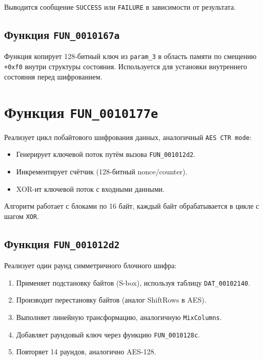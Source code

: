     Выводится сообщение \texttt{SUCCESS} или \texttt{FAILURE} в зависимости от результата.

    \subsection{Функция \texttt{FUN\_0010167a}}

    Функция копирует 128-битный ключ из \texttt{param\_3} в область памяти по смещению \texttt{+0xf0} внутри структуры состояния.
    Используется для установки внутреннего состояния перед шифрованием.


    \section{Функция \texttt{FUN\_0010177e}}

    Реализует цикл побайтового шифрования данных, аналогичный \texttt{AES CTR mode}:
    \begin{itemize}
        \item Генерирует ключевой поток путём вызова \texttt{FUN\_001012d2}.
        \item Инкрементирует счётчик (128-битный nonce/counter).
        \item XOR-ит ключевой поток с входными данными.
    \end{itemize}

    Алгоритм работает с блоками по 16 байт, каждый байт обрабатывается в цикле с шагом \texttt{XOR}.

    \subsection{Функция \texttt{FUN\_001012d2}}

    Реализует один раунд симметричного блочного шифра:
    \begin{enumerate}
        \item Применяет подстановку байтов (S-box), используя таблицу \texttt{DAT\_00102140}.
        \item Производит перестановку байтов (аналог ShiftRows в AES).
        \item Выполняет линейную трансформацию, аналогичную \texttt{MixColumns}.
        \item Добавляет раундовый ключ через функцию \texttt{FUN\_0010128c}.
        \item Повторяет 14 раундов, аналогично AES-128.
    \end{enumerate}


